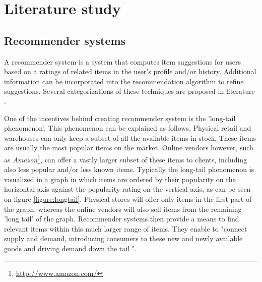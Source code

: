 \chapter{Literature study}\label{chapter:literature_study}



% 
\section{Recommender systems}\label{chapter:literature_study:section:computer}

A recommender system is a system that computes item suggestions for users based on a ratings of related items in the user's profile and/or history. Additional information can be incorporated into the recommendation algorithm to refine suggestions. Several categorizations of these techniques are proposed in literature \cite{bostandjiev:2012, burke:2002, herlocker:2000, melville:2002:CCF:777092.777124, celma:2008:phd}.

One of the incentives behind creating recommender system is the 'long-tail phenomenon'\cite{rajaraman:2012}. This phenomenon can be explained as follows. Physical retail and warehouses can only keep a subset of all the available items in stock. These items are usually the most popular items on the market. Online vendors however, such as \emph{Amazon}\footnote{\url{http://www.amazon.com/}}, can offer a vastly larger subset of these items to clients, including also less popular and/or less known items\cite{rajaraman:2012}. Typically the long-tail phenomenon is visualized in a graph in which items are ordered by their popularity on the horizontal axis against the popularity rating on the vertical axis, as can be seen on figure \ref{figure:longtail}. Physical stores will offer only items in the first part of the graph, whereas the online vendors will also sell items from the remaining 'long tail' of the graph\cite{rajaraman:2012, celma:2008:phd}. Recommender systems then provide a means to find relevant items within this much larger range of items\cite{rajaraman:2012}. They enable to "connect supply and demand, introducing consumers to these new and newly available goods and driving demand down the tail "\cite{anderson:2006:LTW:1197299, celma:2008:phd}.

